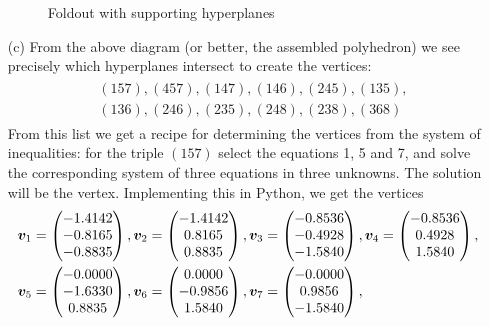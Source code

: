 \documentclass{article}
\begin{document}
\begin{itemize}
\begin{figure}[h!]
  \caption{Foldout with supporting hyperplanes}\label{fig:fold}
\end{figure}
\item[(c)] From the above diagram (or better, the assembled polyhedron) we see precisely which hyperplanes intersect to create the vertices:
\begin{align}\label{eq:list}\tag{2}\begin{split}
 &(157), (457), (147), (146), (245), (135),\\
 &(136), (246), (235), (248), (238), (368)
 \end{split}
\end{align}
From this list we get a recipe for determining the vertices from the system of inequalities: for the triple $(157)$ select the equations 1, 5 and 7, and solve the corresponding system of three equations in three unknowns. The solution will be the vertex. Implementing this in Python, we get the vertices
\begin{align*}
  \vct{v}_1 &= \begin{pmatrix} -1.4142\\   -0.8165\\   -0.8835 \end{pmatrix},
   \vct{v}_2 = \begin{pmatrix}-1.4142\\    0.8165\\    0.8835 \end{pmatrix}, 
   \vct{v}_3 = \begin{pmatrix}-0.8536\\   -0.4928\\   -1.5840 \end{pmatrix}, 
   \vct{v}_4 = \begin{pmatrix}-0.8536\\    0.4928\\    1.5840 \end{pmatrix}, \\
   \vct{v}_5 &= \begin{pmatrix}-0.0000\\   -1.6330\\    0.8835 \end{pmatrix}, 
   \vct{v}_6 = \begin{pmatrix} 0.0000\\   -0.9856\\    1.5840 \end{pmatrix}, 
   \vct{v}_7 = \begin{pmatrix}-0.0000\\    0.9856\\   -1.5840 \end{pmatrix}, 

\end{align*}
\end{itemize}
\end{document}
